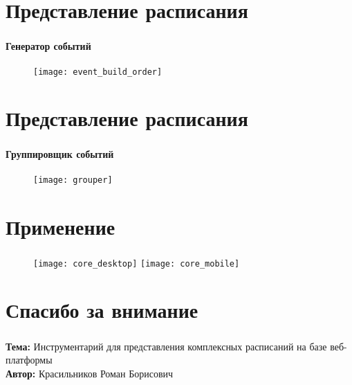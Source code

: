 \section{Представление расписания}

\begin{frame}
\frametitle{\insertsection}
\framesubtitle{Генератор событий}

\vspace{2cm}

\begin{figure}
    \center
    \texttt{[image: event\_build\_order]}
\end{figure}
\end{frame}


\section{Представление расписания}

\begin{frame}
\frametitle{\insertsection}
\framesubtitle{Группировщик событий}

\vspace{1cm}

\begin{figure}
    \center
    \texttt{[image: grouper]}
\end{figure}
\end{frame}


\section{Применение}

\begin{frame}
\frametitle{\insertsection}

\begin{figure}[!htb]
        \texttt{[image: core\_desktop]}
    \endminipage\hfill
        \texttt{[image: core\_mobile]}
    \endminipage
\end{figure}
\end{frame}


\section{Спасибо за внимание}

\begin{frame}
    \frametitle{\insertsection}
    \textbf{Тема:} Инструментарий для представления комплексных расписаний на базе веб-платформы \\
    \textbf{Автор:} Красильников Роман Борисович
\end{frame}

